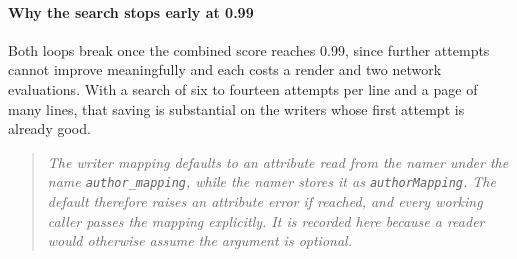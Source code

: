 \paragraph{Why the search stops early at 0.99}
Both loops break once the combined score reaches 0.99, since further attempts cannot improve meaningfully and each costs a render and two network evaluations. With a search of six to fourteen attempts per line and a page of many lines, that saving is substantial on the writers whose first attempt is already good.


\begin{quote}\small\itshape The writer mapping defaults to an attribute read from the namer under the name \texttt{author\_mapping}, while the namer stores it as \texttt{authorMapping}. The default therefore raises an attribute error if reached, and every working caller passes the mapping explicitly. It is recorded here because a reader would otherwise assume the argument is optional.\end{quote}
